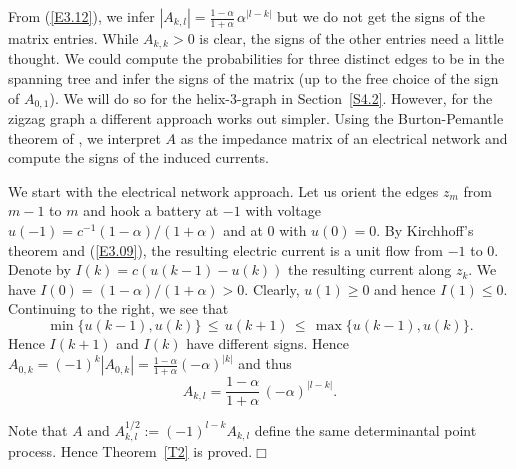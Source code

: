 \documentclass[11pt]{article}
\providecommand{\1}{\mathBB{1}}
\newcommand{\equ}[1]{(\ref{#1})}
\providecommand{\eop}{{}\hfill {}\hfill{$\Box
$}\vspace{0.3cm}\pagebreak[2]\par}
\begin{document}
From \equ{E3.12}, we infer $|A_{k,l}|=\frac{1-\alpha}{1+\alpha}\,\alpha^{|l-k|}$
but we do not get the signs of the matrix entries. While $A_{k,k}>0$ is clear, the signs of the other entries need a little thought. We could compute the probabilities for three distinct edges to be in the spanning tree and infer the signs of the matrix (up to the free choice of the sign of $A_{0,1}$). We will do so for the helix-3-graph in Section~\ref{S4.2}. However, for the zigzag graph a different approach works out simpler. Using the Burton-Pemantle theorem of \cite{BurtonPemantle1993}, we interpret $A$ as the impedance matrix of an electrical network and compute the signs of the induced currents.

We start with the electrical network approach. Let us orient the edges $z_m$ from $m-1$ to $m$ and hook a battery at $-1$ with voltage $u(-1)=c^{-1}(1-\alpha)/(1+\alpha)$ and at $0$ with $u(0)=0$. By Kirchhoff's theorem and \equ{E3.09}, the resulting electric current is a unit flow from $-1$ to $0$. Denote by $I(k)=c(u(k-1)-u(k))$ the resulting current along $z_k$. We have $I(0)=(1-\alpha)/(1+\alpha)>0$. Clearly, $u(1)\geq0$ and hence $I(1)\leq0$. Continuing to the right, we see that
$$\min\big\{u(k-1),u(k)\big\}\,\leq\, u(k+1)\,\leq\, \max\big\{u(k-1),u(k)\big\}.$$
Hence $I(k+1)$ and $I(k)$ have different signs. Hence
$A_{0,k}=(-1)^k|A_{0,k}|=\frac{1-\alpha}{1+\alpha}(-\alpha)^{|k|}$ and thus
$$A_{k,l}=\frac{1-\alpha}{1+\alpha}\,(-\alpha)^{|l-k|}.$$

Note that $A$ and $A^{1/2}_{k,l}:=(-1)^{l-k}A_{k,l}$ define the same determinantal point process. Hence Theorem~\ref{T2} is proved.\eop
\end{document}
